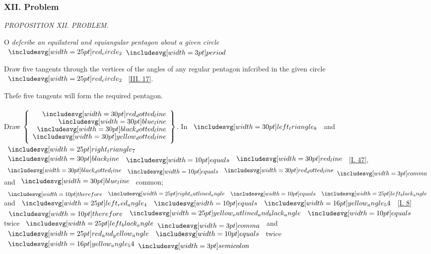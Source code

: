 \documentclass[11pt,preview]{standalone}
\begin{document}
\subsubsection{XII. Problem}

\begin{minipage}[t]{0.43\textwidth}
    \vspace{20pt}
    
\end{minipage}%
\hfill
\begin{minipage}[t]{0.54\textwidth}
    \begin{center}
        \textit{PROPOSITION XII. PROBLEM.}\label{book4pr12} \\
    \end{center}

    \hfill

    \begin{center}
        \raggedright \lettrine[lines=3, loversize=1, nindent=0pt]{}{}O \textit{deſcribe an equilateral and equiangular pentagon about a given circle} $\img{red_circle_2} \bperiod$
    \end{center}
\end{minipage}%

\hfill

\hfill

\raggedright Draw five tangents through the vertices of the angles of any regular pentagon inſcribed in the given circle $\img{red_circle_2}$ [\hyperref[book3pr17]{\textsc{III.} 17}].

\begin{center}
    Theſe five tangents will form the required pentagon.\\
    \hfill\\
    Draw $\left\{\begin{aligned}
            \dottedredline   \\[-2ex]
            \blueline        \\[-2ex]
            \dottedblackline \\[-2ex]
            \dottedyellowline
        \end{aligned}\right\}$. In $\img[0][0][30]{left_triangle_8}$ and $\img{right_triangle_7}$\\
    $\blackline \bequals \redline$ [\hyperref[book1pr47]{\textsc{I.} 47}],\\
    $\dottedblackline \bequals \dottedredline \bcomma$ and $\blueline$ common;\\
    $\btherefore \img{right_outlined_angle} \bequals \img{left_black_angle}$ and $\img{left_red_angle_4} \bequals \img[0][0][16]{yellow_angle_54}$ [\hyperref[book1pr8]{\textsc{I.} 8}]\\
    $\btherefore \img{yellow_outlined_and_black_angle} \bequals$ twice $\img{left_black_angle} \bcomma$ and $\img{red_and_yellow_angle} \bequals$ twice $\img[0][0][16]{yellow_angle_54} \bsemicolon$
\end{center}
\end{document}
